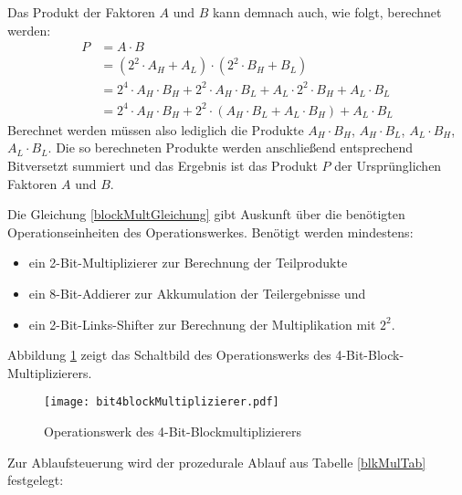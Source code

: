 Das Produkt der Faktoren $A$ und $B$ kann demnach auch, wie folgt, berechnet werden:
\begin{align}
	P &= A \cdot B \\
	  &= (2^2 \cdot A_H + A_L) \cdot (2^2 \cdot B_H + B_L) \\
	  &= 2^4 \cdot A_H \cdot B_H + 2^2 \cdot A_H \cdot B_L + A_L \cdot 2^2 \cdot B_H + A_L \cdot B_L \\
	  &= 2^4 \cdot A_H \cdot B_H + 2^2 \cdot (A_H \cdot B_L + A_L \cdot B_H) + A_L \cdot B_L \label{blockMultGleichung}
\end{align}
Berechnet werden müssen also lediglich die Produkte $A_H \cdot B_H$, $A_H \cdot B_L$, $A_L \cdot B_H$, $A_L \cdot B_L$. Die so berechneten Produkte werden anschließend entsprechend Bitversetzt summiert und das Ergebnis ist das Produkt $P$ der Ursprünglichen Faktoren $A$ und $B$.

Die Gleichung \ref{blockMultGleichung} gibt Auskunft über die benötigten Operationseinheiten des Operationswerkes. Benötigt werden mindestens:
\begin{itemize}
  \item ein 2-Bit-Multiplizierer zur Berechnung der Teilprodukte
  \item ein 8-Bit-Addierer zur Akkumulation der Teilergebnisse und
  \item ein 2-Bit-Links-Shifter zur Berechnung der Multiplikation mit $2^2$.
\end{itemize} 
Abbildung \ref{blockMultOpWerk} zeigt das Schaltbild des Operationswerks des 4-Bit-Block-Multiplizierers.

\begin{figure}[htp]
	\centering
	\texttt{[image: bit4blockMultiplizierer.pdf]}
	\caption{Operationswerk des 4-Bit-Blockmultiplizierers}
	\label{blockMultOpWerk}
\end{figure}

Zur Ablaufsteuerung wird der prozedurale Ablauf aus Tabelle \ref{blkMulTab} festgelegt:

